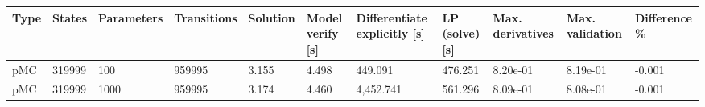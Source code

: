 \begin{tabular}{lllllllllll}
\toprule
Type & States & Parameters & Transitions & Solution & Model verify [s] & Differentiate explicitly [s] & LP (solve) [s] & Max. derivatives & Max. validation & Difference \% \\
\midrule
 pMC & 319999 &        100 &      959995 &    3.155 &            4.498 &                      449.091 &        476.251 &         8.20e-01 &        8.19e-01 &       -0.001 \\
 pMC & 319999 &       1000 &      959995 &    3.174 &            4.460 &                    4,452.741 &        561.296 &         8.09e-01 &        8.08e-01 &       -0.001 \\
\bottomrule
\end{tabular}
